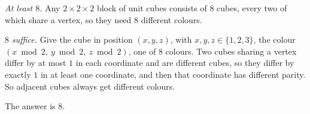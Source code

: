 \emph{At least $8$.} Any $2\times2\times2$ block of unit cubes consists of $8$ cubes, every two of which share a vertex, so they need $8$ different colours.

\emph{$8$ suffice.} Give the cube in position $(x,y,z)$, with $x,y,z\in\{1,2,3\}$, the colour $(x\bmod2,\ y\bmod2,\ z\bmod2)$, one of $8$ colours. Two cubes sharing a vertex differ by at most $1$ in each coordinate and are different cubes, so they differ by exactly $1$ in at least one coordinate, and then that coordinate has different parity. So adjacent cubes always get different colours.

The answer is $\boxed{8}$.
